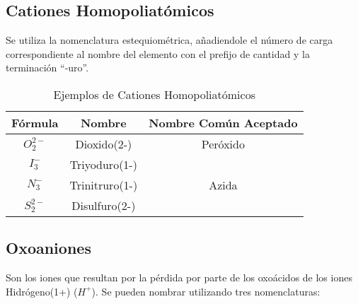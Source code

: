 \subsection{Cationes Homopoliatómicos}
Se utiliza la nomenclatura estequiométrica, añadiendole el número de carga correspondiente al nombre del elemento con el prefijo de cantidad y la terminación “-uro”.
\begin{table}[h!]
	\centering
	\begin{tabular}{c|cc}
		Fórmula&Nombre&Nombre Común Aceptado\\ \hline
		$O_{2}^{2-}$&Dioxido(2-)&Peróxido\\
		$I_{3}^{-}$&Triyoduro(1-)&\\
		$N_{3}^{-}$&Trinitruro(1-)&Azida\\
		$S_{2}^{2-}$&Disulfuro(2-)&\\ \hline
	\end{tabular}
		\caption{Ejemplos de Cationes Homopoliatómicos}
\end{table}

\subsection{Oxoaniones}
Son los iones que resultan por la pérdida por parte de los oxoácidos de los iones Hidrógeno(1+) ($H^{+}$). Se pueden nombrar utilizando tres nomenclaturas:\\

